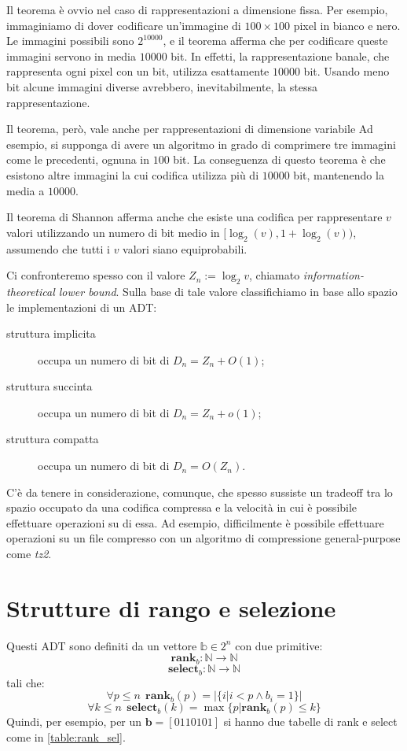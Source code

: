 Il teorema è ovvio nel caso di rappresentazioni a dimensione fissa.
Per esempio, immaginiamo di dover codificare un'immagine di $100\times100$ pixel in bianco e nero.
Le immagini possibili sono $2^{10000}$, e il teorema afferma che per codificare queste immagini servono in media $10000$ bit.
In effetti, la rappresentazione banale, che rappresenta ogni pixel con un bit, utilizza esattamente $10000$ bit.
Usando meno bit alcune immagini diverse avrebbero, inevitabilmente, la stessa rappresentazione.

Il teorema, però, vale anche per rappresentazioni di dimensione variabile
Ad esempio, si supponga di avere un algoritmo in grado di comprimere tre immagini come le precedenti, ognuna in $100$ bit.
La conseguenza di questo teorema è che esistono altre immagini la cui codifica utilizza più di $10000$ bit, mantenendo la media a $10000$.

Il teorema di Shannon afferma anche che esiste una codifica per rappresentare $v$ valori utilizzando un numero di bit medio in $[\log_2(v),1+\log_2(v))$, assumendo che tutti i $v$ valori siano equiprobabili.

Ci confronteremo spesso con il valore $Z_n:=\log_2 v$, chiamato \emph{information-theoretical lower bound}.
Sulla base di tale valore classifichiamo in base allo spazio le implementazioni di un ADT:
\begin{description}
	\item[struttura implicita] occupa un numero di bit di $D_n=Z_n+O(1)$;
	\item[struttura succinta] occupa un numero di bit di $D_n=Z_n+o(1)$;
	\item[struttura compatta] occupa un numero di bit di $D_n=O(Z_n)$.
\end{description}

C'è da tenere in considerazione, comunque, che spesso sussiste un tradeoff tra lo spazio occupato da una codifica compressa e la velocità in cui è possibile effettuare operazioni su di essa.
Ad esempio, difficilmente è possibile effettuare operazioni su un file compresso con un algoritmo di compressione general-purpose come \textit{tz2}.



\section{Strutture di rango e selezione}
Questi ADT sono definiti da un vettore $\mathbb{b} \in 2^n$ con due primitive:
$$
	\mathbf{rank}_b: \mathbb{N} \rightarrow \mathbb{N}
$$
$$
	\mathbf{select}_b: \mathbb{N} \rightarrow \mathbb{N}
$$
tali che:
$$
	\forall p \leq n ~~ \mathbf{rank}_b(p) = |\{i | i < p \land b_i = 1\}|
$$
$$
	\forall k \leq n ~~ \mathbf{select}_b(k) =\max \{p | \mathbf{rank}_b(p) \leq k\}
$$
Quindi, per esempio, per un $\mathbf{b} = [0 1 1 0 1 0 1]$ si hanno due
tabelle di rank e select come in \cref{table:rank_sel}.

